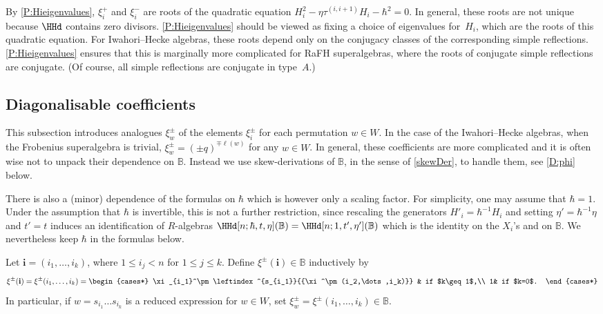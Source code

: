 \documentclass[a4paper,11pt]{amsart}
\newcommand\bi{\mathbf{i}}
\numberwithin{equation}{subsection}
\theoremstyle{definition}
\theoremstyle{theorem}
\theoremstyle{remark}
\newcommand\Sym{W}
\newcommand\taui[1][i]{\tau^{(#1)}}
\newcommand\RR{R}
\newcommand{\Bo}{\mathbb{B}}
\begin{document}
 \begin{Remark}
   By \autoref{P:Hieigenvalues}, $\xi_i^+$ and $\xi_i^-$ are
   roots of the quadratic equation $H_i^2-\eta\taui[i,i+1] H_i-\hbar^2=0$. In
   general, these roots are not unique because $\HHd$ contains zero divisors.
   \autoref{P:Hieigenvalues} should be viewed as fixing a choice of
   eigenvalues for~$H_i$, which are the roots of this quadratic
   equation. For Iwahori--Hecke algebras, these roots depend only on the
   conjugacy classes of the corresponding simple reflections.
   \autoref{P:Hieigenvalues} ensures that this is marginally more
   complicated for RaFH superalgebras, where the roots of conjugate simple
   reflections are conjugate. (Of course, all simple reflections are
   conjugate in type~$A$.)
 \end{Remark}


\subsection{Diagonalisable coefficients}
 This subsection introduces analogues $\xi^\pm_w$ of the elements $\xi^\pm_i$
 for each permutation $w\in W$. In the case of the Iwahori--Hecke
 algebras, when the Frobenius superalgebra is trivial,
 $\xi^\pm_w=(\pm q)^{\mp\ell(w)}$ for any $w\in\Sym$.
 In general, these coefficients are more
 complicated and it is often wise not to unpack their dependence on $\Bo$.  Instead we use skew-derivations of $\Bo$,  in the sense of \autoref{skewDer}, to handle them, see \autoref{D:phi} below.

 There is also a (minor) dependence of the formulas on $\hbar$ which is however only a scaling factor. For simplicity, one may assume  that $\hbar=1$. Under the assumption that $\hbar$ is invertible, this is not a further restriction, since rescaling the generators $H'_i=\hbar^{-1}H_i$ and setting $\eta'=\hbar^{-1}\eta$ and $t'=t$ induces an identification of $\RR$-algebras $\HHd[n;\hbar, t, \eta](\Bo)=\HHd[n;1, t', \eta'](\Bo)$ which is the identity on the $X_i$'s and on $\Bo$. We nevertheless keep $\hbar$ in the formulas below.
  \begin{Definition}\label{D:hw}
   Let $\bi=(i_1,\dots,i_k)$, where $1\le i_j<n$ for $1\le j\le k$.
   Define $\xi^\pm(\bi)\in\Bo$ inductively by
   \[
        \xi^\pm(\bi)=\xi^\pm(i_1,\dots,i_k) = \begin{cases*}
            \xi_{i_1}^\pm\leftindex^{s_{i_1}}{{\xi^\pm(i_2,\dots,i_k)}} & if $k\geq1$,\\
            1& if $k=0$.
        \end{cases*}
   \]
   In particular, if $w=s_{i_1}\dots s_{i_k}$ is a reduced expression
   for $w\in W$, set $\xi^\pm_w=\xi^\pm(i_1,\dots,i_k)\in\Bo$.
 \end{Definition}
\end{document}
